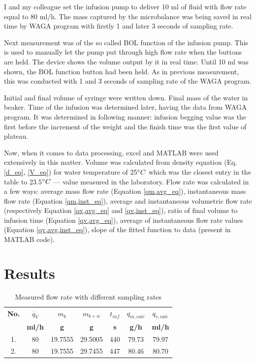 \documentclass[12pt,a4paper]{article}
\begin{document}
	I and my colleague set the infusion pump to deliver 10 ml of fluid with flow rate equal to 80 ml/h. The mass captured by the microbalance was being saved in real time by WAGA program with firstly 1 and later 3 seconds of sampling rate.
	
	Next measurement was of the so called BOL function of the infusion pump. This is used to manually let the pump put through high flow rate when the buttons are held. The device shows the volume output by it in real time. Until 10 ml was shown, the BOL function button had been held. As in previous measurement, this was conducted with 1 and 3 seconds of sampling rate of the WAGA program.
	
	Initial and final volume of syringe were written down. Final mass of the water in beaker. Time of the infusion was determined later, having the data from WAGA program. It was determined in following manner: infusion begging value was the first before the increment of the weight and the finish time was the first value of plateau.
	
	Now, when it comes to data processing, excel and MATLAB were used extensively in this matter. Volume was calculated from density equation (Eq. \ref{d_eq}, \ref{V_eq}) for water temperature of 25$\degree C$ which was the closest entry in the table to 23.5$\degree C$ --- value measured in the laboratory. Flow rate was calculated in a few ways: average mass flow rate (Equation \ref{qm,avg_eq}), instantaneous mass flow rate (Equation \ref{qm,inst_eq}), average and instantaneous volumetric flow rate (respectively Equation \ref{qv,avg_eq} and \ref{qv,inst_eq}), ratio of final volume to infusion time (Equation \ref{qv,avg_eq}), average of instantaneous flow rate values (Equation \ref{qv,avg,inst_eq}), slope of the fitted function to data (present in MATLAB code).
	
	
	
	\newpage
	\section{Results}
	
	\begin{table}[H]
		\centering
		\begin{tabular}{|c|c|c|c|c|c|c|}
			\hline
			\textbf{No.} & $\dot{q_V}$ & $m_b$ & $m_{b+w}$ & $t_{inf}$ & $q_{m,calc}$ & $q_{v,calc}$ \\
			\cline{2-7}
			  & \textbf{ml/h} & \textbf{g} & \textbf{g} & \textbf{s} & \textbf{g/h} & \textbf{ml/h}\\ \hline
			1. & 80 & 19.7555 & 29.5005 & 440 & 79.73 & 79.97 \\ \hline
			2. & 80 & 19.7555 & 29.7455 & 447 & 80.46 & 80.70 \\ \hline
		\end{tabular}
		\caption{Measured flow rate with different sampling rates}
		\label{tab:flow_rate}
	\end{table}
	
\end{document}
